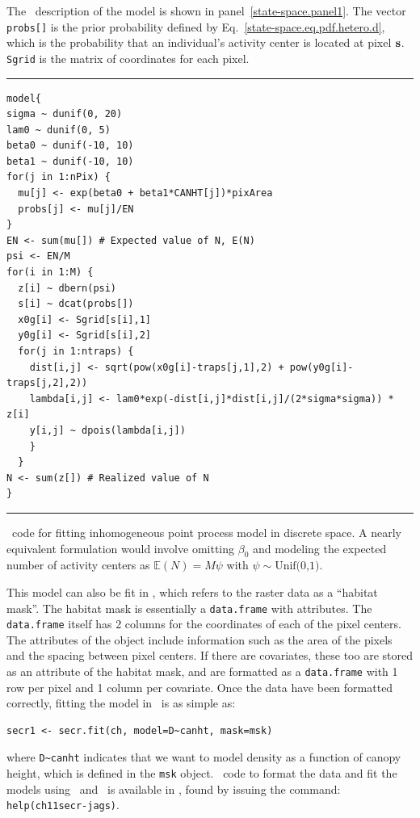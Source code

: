The \bugs~description of the model is shown in
panel~\ref{state-space.panel1}. The vector \verb+probs[]+ is the prior
probability defined by Eq.~\ref{state-space.eq.pdf.hetero.d}, which is
the probability that an individual's activity center is located at
pixel $\bf s$. \verb+Sgrid+ is the matrix of coordinates for each pixel.

\begin{panel}%
\centering
\rule[0.05in]{\textwidth}{.03in}
\begin{small}
\begin{verbatim}
model{
sigma ~ dunif(0, 20)
lam0 ~ dunif(0, 5)
beta0 ~ dunif(-10, 10)
beta1 ~ dunif(-10, 10)
for(j in 1:nPix) {
  mu[j] <- exp(beta0 + beta1*CANHT[j])*pixArea
  probs[j] <- mu[j]/EN
}
EN <- sum(mu[]) # Expected value of N, E(N)
psi <- EN/M
for(i in 1:M) {
  z[i] ~ dbern(psi)
  s[i] ~ dcat(probs[])
  x0g[i] <- Sgrid[s[i],1]
  y0g[i] <- Sgrid[s[i],2]
  for(j in 1:ntraps) {
    dist[i,j] <- sqrt(pow(x0g[i]-traps[j,1],2) + pow(y0g[i]-traps[j,2],2))
    lambda[i,j] <- lam0*exp(-dist[i,j]*dist[i,j]/(2*sigma*sigma)) * z[i]
    y[i,j] ~ dpois(lambda[i,j])
    }
  }
N <- sum(z[]) # Realized value of N
}
\end{verbatim}
\end{small}
\rule[0.15in]{\textwidth}{.03in}
\caption{\bugs~code for fitting inhomogeneous point process model in
  discrete space. A nearly equivalent formulation would involve
  omitting $\beta_0$ and modeling the expected number of activity
  centers as $\mathbb{E}(N)=M\psi$ with $\psi \sim \text{Unif(0,1)}$.}
\label{state-space.panel1}
\end{panel}

This model can also be fit in \secr, which refers
to the raster data as a ``habitat mask''. The habitat mask is
essentially a \verb+data.frame+ with attributes. The \verb+data.frame+
itself has 2 columns for the coordinates of each of the pixel
centers. The attributes of the object include information such as the
area of the pixels and the spacing between pixel centers. If there are
covariates, these too are stored as an attribute of the habitat mask,
and are formatted as a \verb+data.frame+ with 1 row per pixel and 1
column per covariate. Once the data have been formatted
correctly, fitting the model in \secr~is as simple as:
\begin{verbatim}
secr1 <- secr.fit(ch, model=D~canht, mask=msk)
\end{verbatim}
where \verb+D~canht+ indicates that we want to model density as a
function of canopy height, which is defined in the \verb+msk+ object.
\R~code to format the data and fit the models using \secr~and \jags~is
available in \scrbook, found by issuing the command: \verb#help(ch11secr-jags)#.

